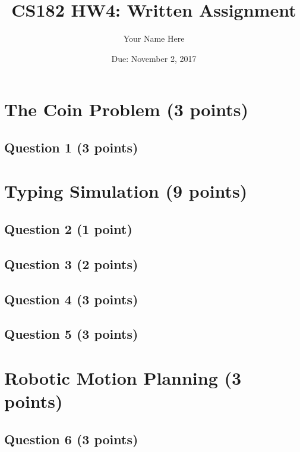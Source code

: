 \documentclass[11pt,letter]{article}
\begin{document}
\title{CS182 HW4: Written Assignment}
\author{Your Name Here}
\date{Due: November 2, 2017}
\maketitle 

\section*{The Coin Problem (3 points)}

\subsection*{Question 1 (3 points)}

\section*{Typing Simulation (9 points)}

\subsection*{Question 2 (1 point)}

\subsection*{Question 3 (2 points)}

\subsection*{Question 4 (3 points)}

\subsection*{Question 5 (3 points)}

\section*{Robotic Motion Planning (3 points)}

\subsection*{Question 6 (3 points)}
\end{document}
